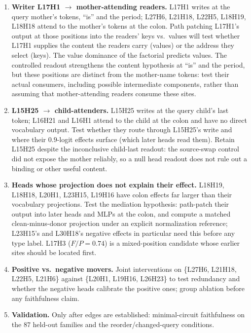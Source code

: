 \documentclass[11pt,a4paper]{article}
\begin{document}
\begin{enumerate}
\item \textbf{Writer L17H1 $\rightarrow$ mother-attending readers.} L17H1 writes at
the query mother's tokens, ``is'' and the period; L27H6, L21H18, L22H5, L18H19,
L18H18 attend to the mother's tokens at the colon. Path patching L17H1's output at
those positions into the readers' keys vs.\ values will test whether L17H1 supplies the
content the readers carry (values) or the address they select (keys). The value
dominance of the factorial predicts values. The controlled readout strengthens the
content hypothesis at ``is'' and the period, but these positions are distinct from
the mother-name tokens: test their actual consumers, including possible intermediate
components, rather than assuming that mother-attending readers consume these sites.
\item \textbf{L15H25 $\rightarrow$ child-attenders.} L15H25 writes at the query child's
last token; L16H21 and L16H1 attend to the child at the colon and have no direct
vocabulary output. Test whether they route through L15H25's write and where their
$0.9$-logit effects surface (which later heads read them). Retain L15H25 despite the
inconclusive child-last readout: the source-swap control did not expose the mother
reliably, so a null head readout does not rule out a binding or other useful content.
\item \textbf{Heads whose projection does not explain their effect.} L18H19, L18H18,
L20H1, L23H15, L19H16 have colon effects far larger than their vocabulary projections.
Test the mediation hypothesis: path-patch their output into later heads and MLPs at the
colon, and compute a matched clean-minus-donor projection under an explicit
normalization reference; L23H15's and L30H18's negative effects in particular need this
before any type label. L17H3 ($F/P=0.74$) is a mixed-position candidate whose earlier
sites should be located first.
\item \textbf{Positive vs.\ negative movers.} Joint interventions on \{L27H6, L21H18,
L22H5, L21H6\} against \{L20H1, L19H16, L26H23\} to test redundancy and whether the
negative heads calibrate the positive ones; group ablation before any faithfulness
claim.
\item \textbf{Validation.} Only after edges are established: minimal-circuit
faithfulness on the 87 held-out families and the reorder/changed-query conditions.
\end{enumerate}
\end{document}
